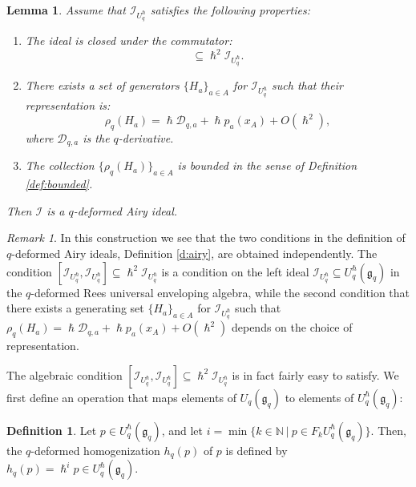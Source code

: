 \documentclass[reqno,11pt]{amsart}
\theoremstyle{plain}
\newtheorem{lemma}[theorem]{Lemma}
\theoremstyle{definition}
\newtheorem{definition}[theorem]{Definition}
\theoremstyle{remark}
\newtheorem{remark}[theorem]{Remark}
\numberwithin{equation}{section}
\newcommand{\1}{\mathds{1}}
\newcommand{\2}{\frac{1}{2}}
\begin{document}
{\begin{lemma}
					Assume that $\mathcal{I}_{U_q^\hslash}$ satisfies the following properties:
					\begin{enumerate}
						\item[(i)]  The ideal is closed under the commutator:
						\begin{equation}
							[\mathcal{I}_{U_q^\hslash}, \mathcal{I}_{U_q^\hslash}] \subseteq \hslash^2 \mathcal{I}_{U_q^\hslash}.
						\end{equation}
						\item[(ii)]  There exists a set of generators $\{H_a\}_{a \in A}$ for $\mathcal{I}_{U_q^\hslash}$ such that their representation is:
						\begin{equation}
							\rho_q(H_a) = \hslash \mathcal{D}_{q,a} + \hslash p_a(x_A) + O(\hslash^2),
						\end{equation}
						where $\mathcal{D}_{q,a}$ is the  $q$-derivative.
						\item[(iii)]  The collection $\{\rho_q(H_a)\}_{a \in A}$ is bounded in the sense of Definition \ref{def:bounded}.
					\end{enumerate}
					Then $\mathcal{I}$ is a  $q$-deformed Airy ideal.
				\end{lemma}
				\begin{remark}
					In this construction we see that the two conditions in the definition of $q$-deformed Airy ideals, Definition \ref{d:airy}, are obtained independently. The condition $[\mathcal{I}_{U_q^\hslash},\mathcal{I}_{U_q^\hslash}] \subseteq \hslash^2 \mathcal{I}_{U_q^\hslash}$ is a condition on the left ideal $\mathcal{I}_{U_q^\hslash} \subseteq U_q^\hslash(\mathfrak{g}_q)$  in the  $q$-deformed Rees universal enveloping algebra, while the second condition that there exists a generating set $\{H_a \}_{a \in A}$ for $\mathcal{I}_{U_q^\hslash}$ such that $\rho_q(H_a) = \hslash \mathcal{D}_{q,a} + \hslash p_a(x_A) + O(\hslash^2)$ depends on the choice of representation.
					
					The algebraic condition $[\mathcal{I}_{U_q^\hslash},\mathcal{I}_{U_q^\hslash}] \subseteq \hslash^2\mathcal{I}_{U_q^\hslash}$ is in fact fairly easy to satisfy. We first define an operation that maps elements of $U_q(\mathfrak{g}_q)$ to elements of $U_q^\hslash(\mathfrak{g}_q)$:
				\end{remark}
				\begin{definition}\label{d:homogenization}
					Let 
					$p \in U_q^\hslash(\mathfrak{g}_q)$, and let  $i = \min\{ k \in \mathbb{N}~|~ p \in F_k U_q^\hslash(\mathfrak{g}_q) \}$. {Then,  the $q$-deformed homogenization $h_q(p)$ of $p$ is defined by $h_q(p) = \hslash^i p \in U_q^\hslash(\mathfrak{g}_q)$.}
					

\end{definition}}
\end{document}
